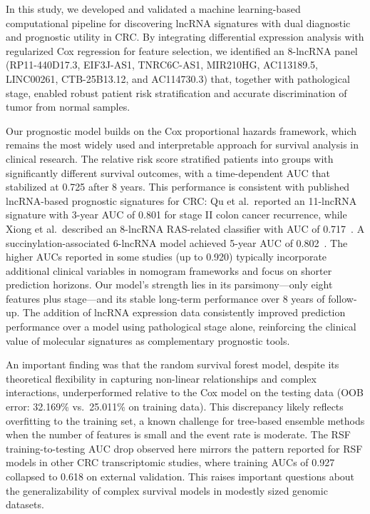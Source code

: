 \documentclass[12pt,a4paper]{article}
\begin{document}
In this study, we developed and validated a machine learning-based computational pipeline for discovering lncRNA signatures with dual diagnostic and prognostic utility in CRC. By integrating differential expression analysis with regularized Cox regression for feature selection, we identified an 8-lncRNA panel (RP11-440D17.3, EIF3J-AS1, TNRC6C-AS1, MIR210HG, AC113189.5, LINC00261, CTB-25B13.12, and AC114730.3) that, together with pathological stage, enabled robust patient risk stratification and accurate discrimination of tumor from normal samples.

Our prognostic model builds on the Cox proportional hazards framework, which remains the most widely used and interpretable approach for survival analysis in clinical research. The relative risk score stratified patients into groups with significantly different survival outcomes, with a time-dependent AUC that stabilized at 0.725 after 8 years. This performance is consistent with published lncRNA-based prognostic signatures for CRC: Qu et al.\ reported an 11-lncRNA signature with 3-year AUC of 0.801 for stage II colon cancer recurrence, while Xiong et al.\ described an 8-lncRNA RAS-related classifier with AUC of 0.717~\cite{ref16}. A succinylation-associated 6-lncRNA model achieved 5-year AUC of 0.802~\cite{ref17}. The higher AUCs reported in some studies (up to 0.920) typically incorporate additional clinical variables in nomogram frameworks and focus on shorter prediction horizons. Our model's strength lies in its parsimony---only eight features plus stage---and its stable long-term performance over 8 years of follow-up. The addition of lncRNA expression data consistently improved prediction performance over a model using pathological stage alone, reinforcing the clinical value of molecular signatures as complementary prognostic tools.

An important finding was that the random survival forest model, despite its theoretical flexibility in capturing non-linear relationships and complex interactions, underperformed relative to the Cox model on the testing data (OOB error: 32.169\% vs.\ 25.011\% on training data). This discrepancy likely reflects overfitting to the training set, a known challenge for tree-based ensemble methods when the number of features is small and the event rate is moderate. The RSF training-to-testing AUC drop observed here mirrors the pattern reported for RSF models in other CRC transcriptomic studies, where training AUCs of 0.927 collapsed to 0.618 on external validation. This raises important questions about the generalizability of complex survival models in modestly sized genomic datasets.
\end{document}
